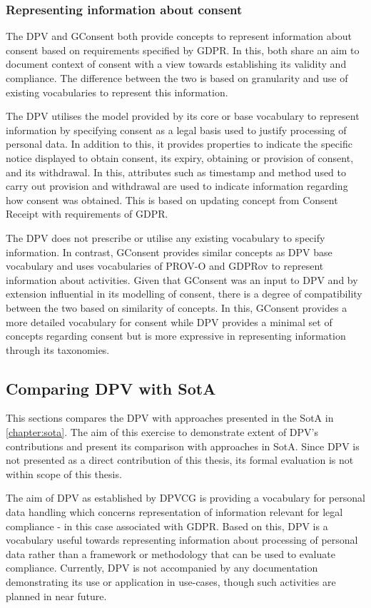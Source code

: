 \subsubsection{Representing information about consent}
The DPV and GConsent both provide concepts to represent information about consent based on requirements specified by GDPR.
In this, both share an aim to document context of consent with a view towards establishing its validity and compliance.
The difference between the two is based on granularity and use of existing vocabularies to represent this information.

The DPV utilises the model provided by its core or base vocabulary to represent information by specifying consent as a legal basis used to justify processing of personal data.
In addition to this, it provides properties to indicate the specific notice displayed to obtain consent, its expiry, obtaining or provision of consent, and its withdrawal.
In this, attributes such as timestamp and method used to carry out provision and withdrawal are used to indicate information regarding how consent was obtained.
This is based on updating concept from Consent Receipt with requirements of  GDPR.

The DPV does not prescribe or utilise any existing vocabulary to specify information.
In contrast, GConsent provides similar concepts as DPV base vocabulary and uses vocabularies of PROV-O and GDPRov to represent information about activities.
Given that GConsent was an input to DPV and by extension influential in its modelling of consent, there is a degree of compatibility between the two based on similarity of concepts.
In this, GConsent provides a more detailed vocabulary for consent while DPV provides a minimal set of concepts regarding consent but is more expressive in representing information through its taxonomies.

\subsection{Comparing DPV with SotA}\label{sec:voc:dpv-sota}
This sections compares the DPV with approaches presented in the SotA in \autoref{chapter:sota}.
The aim of this exercise to demonstrate extent of DPV's contributions and present its comparison with approaches in SotA.
Since DPV is not presented as a direct contribution of this thesis, its formal evaluation is not within scope of this thesis.

The aim of DPV as established by DPVCG is providing a vocabulary for personal data handling which concerns representation of information relevant for legal compliance - in this case associated with GDPR. Based on this, DPV is a vocabulary useful towards representing information about processing of personal data rather than a framework or methodology that can be used to evaluate compliance.
Currently, DPV is not accompanied by any documentation demonstrating its use or application in use-cases, though such activities are planned in near future.

